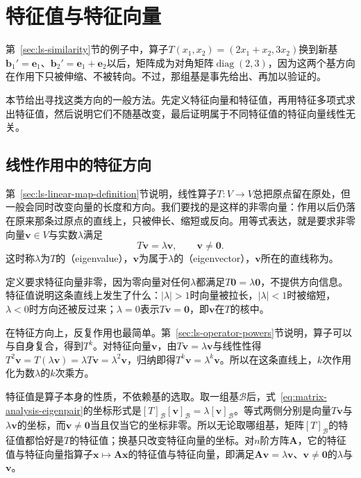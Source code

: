 
\section{特征值与特征向量}
\label{sec:ls-linear-operators}

第~\ref{sec:ls-similarity}节的例子中，算子$T(x_1,x_2)=(2x_1+x_2,3x_2)$换到新基$\bm b_1'=\bm e_1$、$\bm b_2'=\bm e_1+\bm e_2$以后，矩阵成为对角矩阵$\operatorname{diag}(2,3)$，因为这两个基方向在作用下只被伸缩、不被转向。不过，那组基是事先给出、再加以验证的。

本节给出寻找这类方向的一般方法。先定义特征向量和特征值，再用特征多项式求出特征值，然后说明它们不随基改变，最后证明属于不同特征值的特征向量线性无关。

\subsection{线性作用中的特征方向}
\label{sec:ls-operator-eigenvectors}

第~\ref{sec:ls-linear-map-definition}节说明，线性算子$T:V\to V$总把原点留在原处，但一般会同时改变向量的长度和方向。我们要找的是这样的非零向量：作用以后仍落在原来那条过原点的直线上，只被伸长、缩短或反向。用等式表达，就是要求非零向量$\bm v\in V$与实数$\lambda$满足
\begin{equation}
T\bm v=\lambda\bm v,\qquad\bm v\neq\bm0.
\label{eq:matrix-analysis-eigenpair}
\end{equation}
这时称$\lambda$为$T$的（eigenvalue），$\bm v$为属于$\lambda$的（eigenvector），$\bm v$所在的直线称为。

定义要求特征向量非零，因为零向量对任何$\lambda$都满足$T\bm0=\lambda\bm0$，不提供方向信息。特征值说明这条直线上发生了什么：$|\lambda|>1$时向量被拉长，$|\lambda|<1$时被缩短，$\lambda<0$时方向还被反过来；$\lambda=0$表示$T\bm v=\bm0$，即$\bm v$在$T$的核中。

在特征方向上，反复作用也最简单。第~\ref{sec:ls-operator-powers}节说明，算子可以与自身复合，得到$T^k$。对特征向量$\bm v$，由$T\bm v=\lambda\bm v$与线性性得$T^2\bm v=T(\lambda\bm v)=\lambda T\bm v=\lambda^2\bm v$，归纳即得$T^k\bm v=\lambda^k\bm v$。所以在这条直线上，$k$次作用化为数$\lambda$的$k$次乘方。

特征值是算子本身的性质，不依赖基的选取。取一组基$\mathcal B$后，式~\eqref{eq:matrix-analysis-eigenpair}的坐标形式是$[T]_{\mathcal B}[\bm v]_{\mathcal B}=\lambda[\bm v]_{\mathcal B}$。等式两侧分别是向量$T\bm v$与$\lambda\bm v$的坐标，而$\bm v\neq\bm0$当且仅当它的坐标非零。所以无论取哪组基，矩阵$[T]_{\mathcal B}$的特征值都恰好是$T$的特征值；换基只改变特征向量的坐标。对$n$阶方阵$\bm A$，它的特征值与特征向量指算子$\bm x\mapsto\bm A\bm x$的特征值与特征向量，即满足$\bm A\bm v=\lambda\bm v$、$\bm v\neq\bm0$的$\lambda$与$\bm v$。

